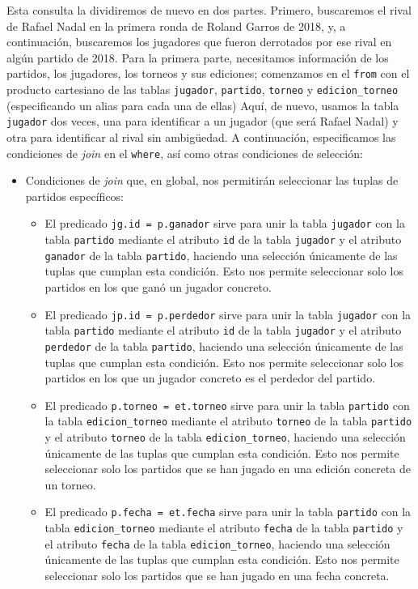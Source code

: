 \documentclass[11pt]{opticajnl}
\begin{document}
Esta consulta la dividiremos de nuevo en dos partes. Primero, buscaremos el rival de Rafael Nadal en la primera ronda de Roland Garros de 2018, y, a continuación, buscaremos los jugadores que fueron derrotados por ese rival en algún partido de 2018. Para la primera parte, necesitamos información de los partidos, los jugadores, los torneos y sus ediciones; comenzamos en el \texttt{from} con el producto cartesiano de las tablas \texttt{jugador}, \texttt{partido}, \texttt{torneo} y \texttt{edicion\_torneo} (especificando un alias para cada una de ellas) Aquí, de nuevo, usamos la tabla \texttt{jugador} dos veces, una para identificar a un jugador (que será Rafael Nadal) y otra para identificar al rival sin ambigüedad. A continuación, especificamos las condiciones de \textit{join} en el \texttt{where}, así como otras condiciones de selección:
\begin{itemize}
\item Condiciones de \textit{join} que, en global, nos permitirán seleccionar las tuplas de partidos específicos:
\begin{itemize}
\item El predicado \texttt{jg.id = p.ganador} sirve para unir la tabla \texttt{jugador} con la tabla \texttt{partido} mediante el atributo \texttt{id} de la tabla \texttt{jugador} y el atributo \texttt{ganador} de la tabla \texttt{partido}, haciendo una selección únicamente de las tuplas que cumplan esta condición. Esto nos permite seleccionar solo los partidos en los que ganó un jugador concreto.
\item El predicado \texttt{jp.id = p.perdedor} sirve para unir la tabla \texttt{jugador} con la tabla \texttt{partido} mediante el atributo \texttt{id} de la tabla \texttt{jugador} y el atributo \texttt{perdedor} de la tabla \texttt{partido}, haciendo una selección únicamente de las tuplas que cumplan esta condición. Esto nos permite seleccionar solo los partidos en los que un jugador concreto es el perdedor del partido.
\item El predicado \texttt{p.torneo = et.torneo} sirve para unir la tabla \texttt{partido} con la tabla \texttt{edicion\_torneo} mediante el atributo \texttt{torneo} de la tabla \texttt{partido} y el atributo \texttt{torneo} de la tabla \texttt{edicion\_torneo}, haciendo una selección únicamente de las tuplas que cumplan esta condición. Esto nos permite seleccionar solo los partidos que se han jugado en una edición concreta de un torneo.
\item El predicado \texttt{p.fecha = et.fecha} sirve para unir la tabla \texttt{partido} con la tabla \texttt{edicion\_torneo} mediante el atributo \texttt{fecha} de la tabla \texttt{partido} y el atributo \texttt{fecha} de la tabla \texttt{edicion\_torneo}, haciendo una selección únicamente de las tuplas que cumplan esta condición. Esto nos permite seleccionar solo los partidos que se han jugado en una fecha concreta.

\end{itemize}
\end{itemize}
\end{document}

